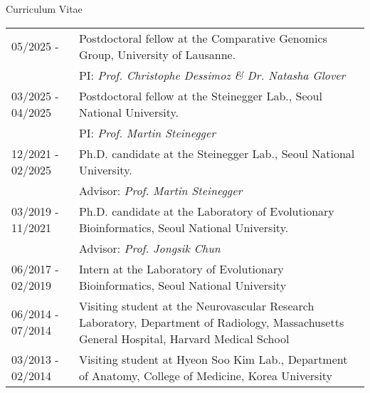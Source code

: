\documentclass{resume} %
\newcommand{\piinfo}[2]{\hfill\textcolor{black!70}{\fontsize{10pt}{11.5pt}\selectfont #1: \textit{#2}}}
\begin{document}
\begin{rSection}{Curriculum Vitae}
\begin{tabular}{p{3.6cm}p{13.0cm}}
05/2025 - & Postdoctoral fellow at the Comparative Genomics Group, University of Lausanne.\\
& \piinfo{PI}{Prof. Christophe Dessimoz \& Dr. Natasha Glover} \\[1.mm]
03/2025 - 04/2025 & Postdoctoral fellow at the Steinegger Lab., Seoul National University. \\
& \piinfo{PI}{Prof. Martin Steinegger} \\[1.mm]
12/2021 - 02/2025 & Ph.D. candidate at the Steinegger Lab., Seoul National University. \\
& \piinfo{Advisor}{Prof. Martin Steinegger} \\[1.mm]
03/2019 - 11/2021 & Ph.D. candidate at the Laboratory of Evolutionary Bioinformatics, Seoul National University. \\
& \piinfo{Advisor}{Prof. Jongsik Chun} \\[1.mm]
06/2017 - 02/2019 & Intern at the Laboratory of Evolutionary Bioinformatics, Seoul National University
\\[1.mm]
06/2014 - 07/2014 & Visiting student at the Neurovascular Research Laboratory, Department of Radiology, Massachusetts General Hospital, Harvard Medical School
\\[1.mm]
03/2013 - 02/2014 & Visiting student at Hyeon Soo Kim Lab., Department of Anatomy, College of Medicine, Korea University
\\[1.mm]
\end{tabular}
\vspace{1mm}
\end{rSection}

\newpage
\end{document}
